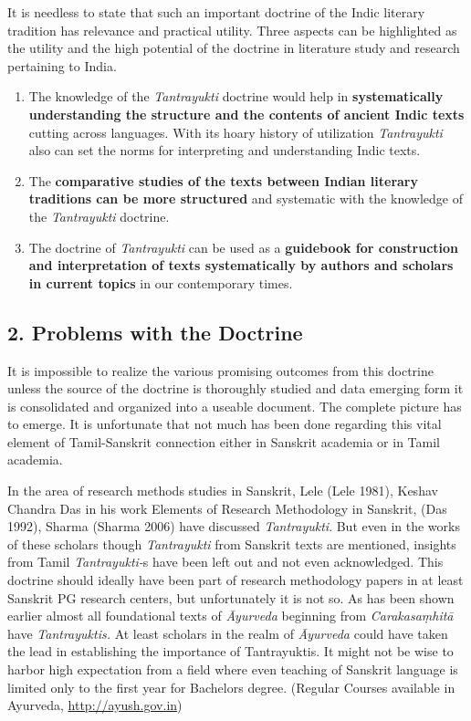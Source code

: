 It is needless to state that such an important doctrine of the Indic literary tradition has relevance and practical utility. Three aspects can be highlighted as the utility and the high potential of the doctrine in literature study and research pertaining to India.

\begin{enumerate}[{\rm a)}]
\itemsep=1pt
\item The knowledge of the \textit{Tantrayukti} doctrine would help in \textbf{systematically understanding the structure and the contents of ancient Indic texts} cutting across languages. With its hoary history of utilization \textit{Tantrayukti} also can set the norms for interpreting and understanding Indic texts.

 \item The \textbf{comparative studies of the texts between Indian literary traditions can be more structured} and systematic with the knowledge of the \textit{Tantrayukti} doctrine.

 \item The doctrine of \textit{Tantrayukti} can be used as a \textbf{guidebook for construction and interpretation of texts systematically by authors and scholars in current topics} in our contemporary times.

\end{enumerate}


\subsection*{2. Problems with the Doctrine}

It is impossible to realize the various promising outcomes from this doctrine unless the source of the doctrine is thoroughly studied and data emerging form it is consolidated and organized into a useable document. The complete picture has to emerge. It is unfortunate that not much has been done regarding this vital element of Tamil-Sanskrit connection either in Sanskrit academia or in Tamil academia.

In the area of research methods studies in Sanskrit, Lele (Lele 1981), Keshav Chandra Das in his work Elements of Research Methodology in Sanskrit, (Das 1992), Sharma (Sharma 2006) have discussed \textit{Tantrayukti}. But even in the works of these scholars though \textit{Tantrayukti} from Sanskrit texts are mentioned, insights from Tamil \textit{Tantrayukti-}s have been left out and not even acknowledged. This doctrine should ideally have been part of research methodology papers in at least Sanskrit PG research centers, but unfortunately it is not so. As has been shown earlier almost all foundational texts of \textit{Āyurveda} beginning from \textit{Carakasaṃhitā} have \textit{Tantrayuktis.} At least scholars in the realm of \textit{Āyurveda} could have taken the lead in establishing the importance of Tantrayuktis. It might not be wise to harbor high expectation from a field where even teaching of Sanskrit language is limited only to the first year for Bachelors degree. (Regular Courses available in Ayurveda, \url{http://ayush.gov.in})

